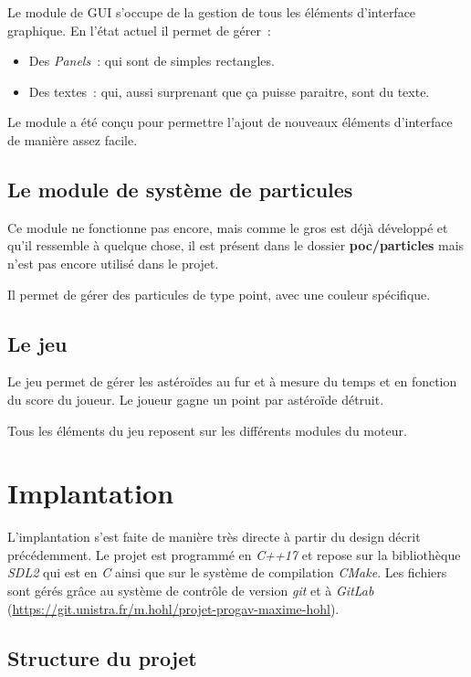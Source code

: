 \documentclass[10pt, french, a4paper]{report}
\begin{document}
Le module de GUI s'occupe de la gestion de tous les éléments d'interface graphique.
En l'état actuel il permet de gérer~:
\begin{itemize}
	\item Des \textit{Panels}~: qui sont de simples rectangles.
	\item Des textes~: qui, aussi surprenant que ça puisse paraitre, sont du texte.
\end{itemize}

Le module a été conçu pour permettre l'ajout de nouveaux éléments d'interface de 
manière assez facile. 

\section{Le module de système de particules}

Ce module ne fonctionne pas encore, mais comme le gros est déjà développé et qu'il 
ressemble à quelque chose, il est présent dans le dossier \textbf{poc/particles} 
mais n'est pas encore utilisé dans le projet.

Il permet de gérer des particules de type point, avec une couleur spécifique.

\section{Le jeu}

Le jeu permet de gérer les astéroïdes au fur et à mesure du temps et en fonction 
du score du joueur. 
Le joueur gagne un point par astéroïde détruit. 

Tous les éléments du jeu reposent sur les différents modules du moteur.


\chapter{Implantation}

L'implantation s'est faite de manière très directe à partir du design décrit 
précédemment.
Le projet est programmé en \textit{C++17} et repose sur la bibliothèque \textit{SDL2}
qui est en \textit{C} ainsi que sur le système de compilation \textit{CMake}.
Les fichiers sont gérés grâce au système de contrôle de version \textit{git} 
et à \textit{GitLab} (\url{https://git.unistra.fr/m.hohl/projet-progav-maxime-hohl}).

\section{Structure du projet}
\end{document}

